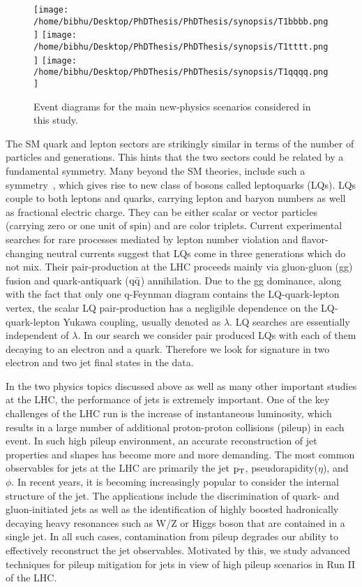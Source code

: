 \begin{figure}[h]
\centering
\texttt{[image: /home/bibhu/Desktop/PhDThesis/PhDThesis/synopsis/T1bbbb.png]}
\texttt{[image: /home/bibhu/Desktop/PhDThesis/PhDThesis/synopsis/T1tttt.png]}
\texttt{[image: /home/bibhu/Desktop/PhDThesis/PhDThesis/synopsis/T1qqqq.png]}

\caption{\label{fig:frog}Event diagrams for the main new-physics scenarios considered in this study.}
\end{figure}

The SM quark and lepton sectors are strikingly similar in terms of the number of particles and generations. This hints that the two sectors could be
related by a fundamental symmetry. Many beyond the SM theories, include
such a symmetry~\cite{composite,LQ2,LQ3,LQ4}, which gives rise to new class of bosons called leptoquarks (LQs). LQs couple
to both leptons and quarks, carrying lepton and baryon numbers as well as fractional electric charge.
They can be either scalar or vector particles (carrying zero or one unit of spin) and are color
triplets. Current experimental searches for rare processes mediated by lepton number violation and
flavor-changing neutral currents suggest that LQs come in three generations which do
not mix. Their pair-production at the LHC proceeds mainly via gluon-gluon (gg) fusion  and
quark-antiquark ($\rm q\bar{q}$) annihilation. Due  to  the gg dominance,  along  with  the  fact  that  only  one q-Feynman  diagram
contains the LQ-quark-lepton vertex, the scalar LQ pair-production has a negligible dependence on the
 LQ-quark-lepton Yukawa coupling, usually denoted as $\lambda$. LQ searches are essentially independent of $\lambda$. 
In our search we consider pair produced LQs with each of them decaying to an electron and a quark. Therefore we look for signature in two electron and two jet final states in the data.

In the two physics topics discussed above as well as many other important studies at the LHC, the performance of jets is extremely important.
 One of the key challenges of the  LHC run is the increase of instantaneous luminosity, which results in a large number of additional proton-proton collisions (pileup) in each event. In such high pileup environment, an accurate reconstruction of jet properties and shapes has become more and more demanding. The most common observables for jets at the LHC  are primarily the jet $\rm p_{T}$, pseudorapidity($\eta$), and $\phi$.
In recent years, it is becoming increasingly popular to consider the internal structure of the jet. The applications include the discrimination of quark- and gluon-initiated jets as well as the identification of highly boosted hadronically decaying heavy resonances such as W/Z or Higgs boson that are contained in a single jet.  
In all such cases, contamination from pileup degrades our ability to effectively reconstruct the jet observables.  
Motivated by this, we study advanced techniques for pileup mitigation for jets in view of high pileup scenarios in Run II of the LHC.





